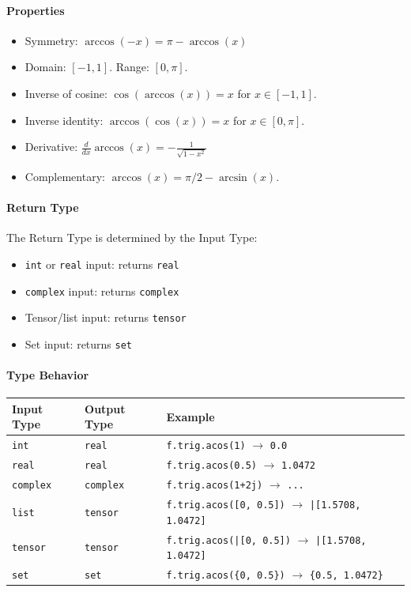 \paragraph{Properties}
\begin{itemize}
\item Symmetry: $\arccos(-x) = \pi - \arccos(x)$
\item Domain: $[-1, 1]$. Range: $[0, \pi]$.
\item Inverse of cosine: $\cos(\arccos(x)) = x$ for $x \in [-1, 1]$.
\item Inverse identity: $\arccos(\cos(x)) = x$ for $x \in [0, \pi]$.
\item Derivative: $\frac{d}{dx}\arccos(x) = -\frac{1}{\sqrt{1 - x^2}}$
\item Complementary: $\arccos(x) = \pi/2 - \arcsin(x)$.
\end{itemize}

\paragraph{Return Type}
The Return Type is determined by the Input Type:
\begin{itemize}
\item \texttt{int} or \texttt{real} input: returns \texttt{real}
\item \texttt{complex} input: returns \texttt{complex}
\item Tensor/list input: returns \texttt{tensor}
\item Set input: returns \texttt{set}
\end{itemize}

\paragraph{Type Behavior}
\begin{center}
\begin{tabular}{lll}
\textbf{Input Type} & \textbf{Output Type} & \textbf{Example} \\ \hline
\texttt{int} & \texttt{real} & \texttt{f.trig.acos(1)} $\to$ \texttt{0.0} \\
\texttt{real} & \texttt{real} & \texttt{f.trig.acos(0.5)} $\to$ \texttt{1.0472} \\
\texttt{complex} & \texttt{complex} & \texttt{f.trig.acos(1+2j)} $\to$ \texttt{...} \\
\texttt{list} & \texttt{tensor} & \texttt{f.trig.acos([0, 0.5])} $\to$ \texttt{|[1.5708, 1.0472]} \\
\texttt{tensor} & \texttt{tensor} & \texttt{f.trig.acos(|[0, 0.5])} $\to$ \texttt{|[1.5708, 1.0472]} \\
\texttt{set} & \texttt{set} & \texttt{f.trig.acos(\{0, 0.5\})} $\to$ \texttt{\{0.5, 1.0472\}} \\
\end{tabular}
\end{center}

